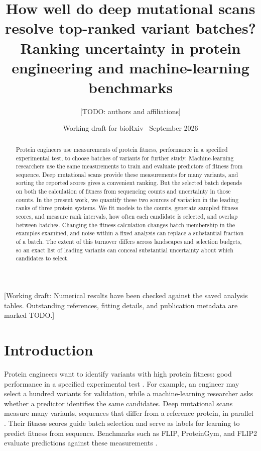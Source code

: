 \documentclass[11pt]{article}
\title{How well do deep mutational scans resolve top-ranked variant batches?\\
\large Ranking uncertainty in protein engineering and machine-learning benchmarks}
\author{[TODO: authors and affiliations]}
\date{Working draft for bioRxiv \textbar\ September 2026}
\newcommand{\note}[1]{\textcolor{boxrule}{\small[#1]}}
\begin{document}
\maketitle

\noindent\note{Working draft: Numerical results have been checked against the
saved analysis tables. Outstanding references, fitting details, and publication
metadata are marked TODO.}

\begin{abstract}
Protein engineers use measurements of protein fitness, performance in a
specified experimental test, to choose batches of variants for further study.
Machine-learning researchers use the same measurements to train and evaluate
predictors of fitness from sequence. Deep mutational scans provide these
measurements for many variants, and sorting the reported scores gives a
convenient ranking. But the selected batch depends on both the calculation
of fitness from sequencing counts and uncertainty in those counts. In the
present work, we quantify these two sources of variation in the leading
ranks of three protein systems. We fit models to the counts, generate
sampled fitness scores, and measure rank intervals, how often each candidate
is selected, and overlap between batches. Changing the fitness calculation
changes batch membership in the examples examined, and noise within a fixed
analysis can replace a substantial fraction of a batch. The extent of this
turnover differs across landscapes and selection budgets, so an exact list
of leading variants can conceal substantial uncertainty about which
candidates to select.
\end{abstract}

\section{Introduction}
\label{sec:introduction}

Protein engineers want to identify variants with high protein fitness:
good performance in a specified experimental test \citep{yang2019}.
For example, an engineer may select a hundred variants for validation,
while a machine-learning researcher asks whether a predictor identifies
the same candidates. Deep mutational scans measure many variants, sequences
that differ from a reference protein, in parallel \citep{fowler2014}.
Their fitness scores guide batch selection and serve as labels for learning
to predict fitness from sequence. Benchmarks such as FLIP, ProteinGym,
and FLIP2 evaluate predictions against these measurements
\citep{dallago2021,notin2023,didi2026}.
\end{document}
